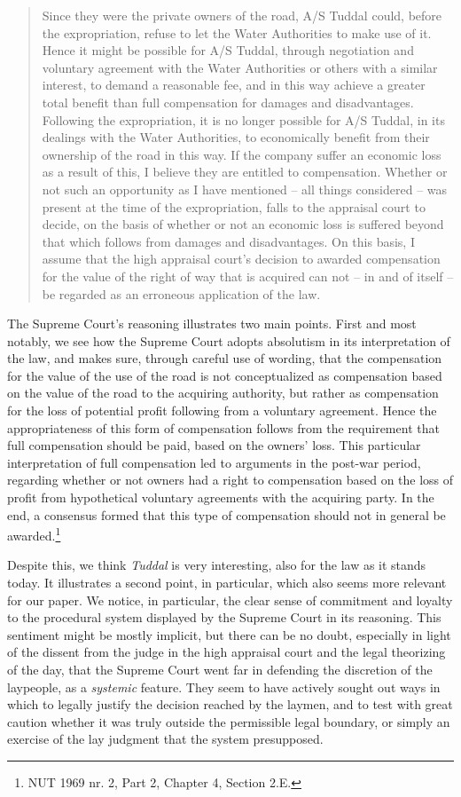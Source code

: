 \begin{quote}
Since they were the private owners of the road, A/S Tuddal could, before the expropriation, refuse to let the Water Authorities to make use of it. Hence it might be possible for A/S Tuddal, through negotiation and voluntary agreement with the Water Authorities or others with a similar interest, to demand a reasonable fee, and in this way achieve a greater total benefit than full compensation for damages and disadvantages. Following the expropriation, it is no longer possible for A/S Tuddal, in its dealings with the Water Authorities, to economically benefit from their ownership of the road in this way. If the company suffer an economic loss as a result of this, I believe they are entitled to compensation. Whether or not such an opportunity as I have mentioned -- all things considered -- was present at the time of the expropriation, falls to the appraisal court to decide, on the basis of whether or not an economic loss is suffered beyond that which follows from damages and disadvantages. On this basis, I assume that the high appraisal court's decision to awarded compensation for the value of the right of way that is acquired can not -- in and of itself -- be regarded as an erroneous application of the law.
\end{quote}

The Supreme Court's reasoning illustrates two main points. First and most notably, we see how the Supreme Court adopts absolutism in its interpretation of the law, and makes sure, through careful use of wording, that the compensation for the value of the use of the road is not conceptualized as compensation based on the value of the road to the acquiring authority, but rather as compensation for the loss of potential profit following from a voluntary agreement. Hence the appropriateness of this form of compensation follows from the requirement that full compensation should be paid, based on the owners' loss. This particular interpretation of full compensation led to arguments in the post-war period, regarding whether or not owners had a right to compensation based on the loss of profit from hypothetical voluntary agreements with the acquiring party. In the end, a consensus formed that this type of compensation should not in general be awarded.\footnote{NUT 1969 nr. 2, Part 2, Chapter 4, Section 2.E.}

Despite this, we think \emph{Tuddal} is very interesting, also for the law as it stands today. It illustrates a second point, in particular, which also seems more relevant for our paper. We notice, in particular, the clear sense of commitment and loyalty to the procedural system displayed by the Supreme Court in its reasoning. This sentiment might be mostly implicit, but there can be no doubt, especially in light of the dissent from the judge in the high appraisal court and the legal theorizing of the day, that the Supreme Court went far in defending the discretion of the laypeople, as a \emph{systemic} feature. They seem to have actively sought out ways in which to legally justify the decision reached by the laymen, and to test with great caution whether it was truly outside the permissible legal boundary, or simply an exercise of the lay judgment that the system presupposed. 



